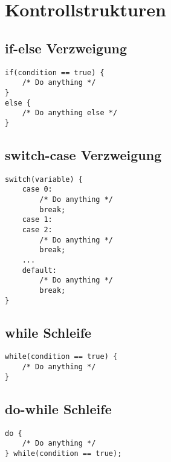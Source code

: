 



\newpage
\section{Kontrollstrukturen}

\subsection{if-else Verzweigung}
\begin{lstlisting}[caption=if Verzweigung]
if(condition == true) {
    /* Do anything */
}
else {
    /* Do anything else */
}
\end{lstlisting}

\subsection{switch-case Verzweigung}
\begin{lstlisting}[caption=switch-case Verzweigung]
switch(variable) {
    case 0: 
        /* Do anything */
        break;
    case 1: 
    case 2:
        /* Do anything */
        break;
    ...
    default: 
        /* Do anything */
        break;
}
\end{lstlisting}

\subsection{while Schleife}
\begin{lstlisting}[caption=while Schleife]
while(condition == true) {
    /* Do anything */
}
\end{lstlisting}

\subsection{do-while Schleife}
\begin{lstlisting}[caption=do-while]
do {
    /* Do anything */
} while(condition == true);
\end{lstlisting}

